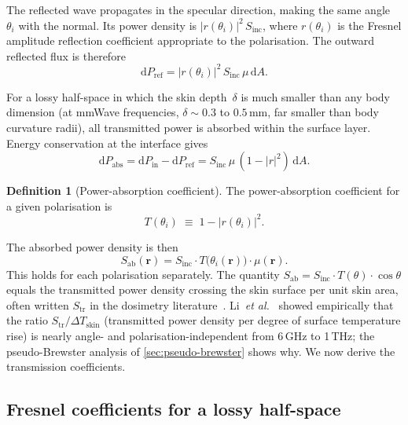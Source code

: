 \documentclass[11pt,a4paper]{article}
\theoremstyle{definition}      %
\newtheorem{definition}[definition]{Definition}
\newcommand{\rr}{\mathbf{r}}
\newcommand{\Sinc}{S_{\mathrm{inc}}}
\newcommand{\Sab}{S_{\mathrm{ab}}}
\newcommand{\diff}{\mathrm{d}}        %
\begin{document}
The reflected wave propagates in the specular direction, making the
same angle~$\theta_i$ with the normal.  Its power density is
$|r(\theta_i)|^2\,\Sinc$, where $r(\theta_i)$ is the Fresnel
amplitude reflection coefficient appropriate to the polarisation.  The
outward reflected flux is therefore
\begin{equation}
  \diff P_{\mathrm{ref}} = |r(\theta_i)|^2\,\Sinc\,\mu\,\diff A.
\end{equation}

For a lossy half-space in which the skin depth~$\delta$ is much
smaller than any body dimension (at mmWave frequencies,
$\delta\sim 0.3$ to $0.5$\,mm, far smaller than body curvature radii),
all transmitted power is absorbed within the surface layer.  Energy
conservation at the interface gives
\begin{equation}
  \diff P_{\mathrm{abs}} = \diff P_{\mathrm{in}} - \diff P_{\mathrm{ref}}
  = \Sinc\,\mu\,(1-|r|^2)\,\diff A.
\end{equation}

\begin{definition}[Power-absorption coefficient]
The power-absorption coefficient for a given polarisation is
\begin{equation}\label{eq:T-def}
  T(\theta_i) \;\equiv\; 1 - |r(\theta_i)|^2.
\end{equation}
\end{definition}

The absorbed power density is then
\begin{equation}\label{eq:Sab-exact-single-pol}
  \boxed{\Sab(\rr) = \Sinc \cdot T\!\bigl(\theta_i(\rr)\bigr)
    \cdot \mu(\rr).}
\end{equation}
This holds for each polarisation separately.  The quantity
$\Sab = \Sinc\cdot T(\theta)\cdot\cos\theta$ equals the transmitted
power density crossing the skin surface per unit skin area, often written
$S_{\mathrm{tr}}$ in the dosimetry literature~\cite{Li2019,Funahashi2018}.
Li~\textit{et al.}~\cite{Li2019} showed empirically that the ratio
$S_{\mathrm{tr}}/\Delta T_{\mathrm{skin}}$ (transmitted power density
per degree of surface temperature rise) is nearly angle- and
polarisation-independent from 6\,GHz to 1\,THz; the pseudo-Brewster
analysis of \cref{sec:pseudo-brewster} shows why.
We now derive the transmission coefficients.

\subsection{Fresnel coefficients for a lossy half-space}
\label{sec:fresnel}
\end{document}
